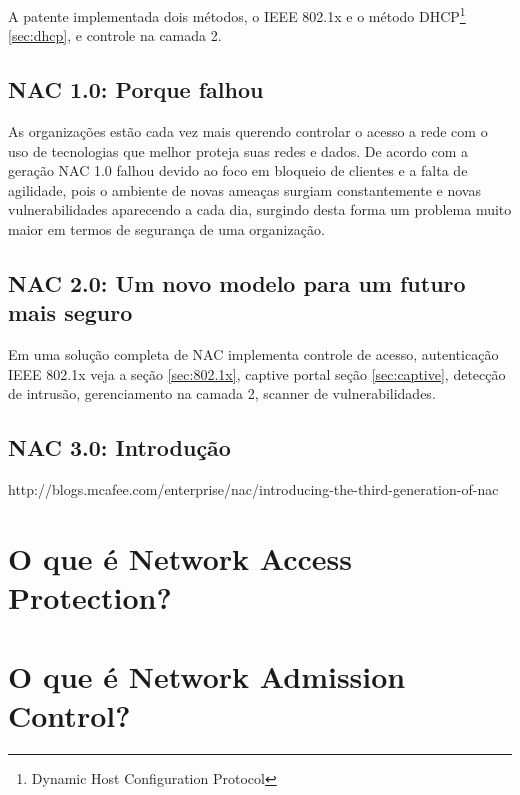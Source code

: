 \documentclass[12pt, brazil, ruledheader, pnumromarab,normaltoc]{abnt}
\begin{document}
A patente \cite{nac} implementada dois métodos, o IEEE 802.1x \cite{802.1x} e o método DHCP\footnote{Dynamic Host Configuration Protocol} \ref{sec:dhcp}, e controle na camada 2.

\subsection{NAC 1.0: Porque falhou}
As organizações estão cada vez mais querendo controlar o acesso a rede com o uso de tecnologias que melhor proteja suas redes e dados.
De acordo com \cite{mfrizzi} a geração NAC 1.0 falhou devido ao foco em bloqueio de clientes e a falta de agilidade, pois o ambiente de novas ameaças surgiam constantemente e novas vulnerabilidades aparecendo a cada dia, surgindo desta forma um problema muito maior em termos de segurança de uma organização.

\subsection{NAC 2.0: Um novo modelo para um futuro mais seguro}
Em uma solução completa de NAC \cite{nac} implementa controle de acesso, autenticação IEEE 802.1x veja a seção \ref{sec:802.1x}, captive portal seção \ref{sec:captive}, detecção de intrusão, gerenciamento na camada 2, scanner de vulnerabilidades. 

\subsection{NAC 3.0: Introdução}
http://blogs.mcafee.com/enterprise/nac/introducing-the-third-generation-of-nac

\section{O que é Network Access Protection?}

\section{O que é Network Admission Control?}
\end{document}

